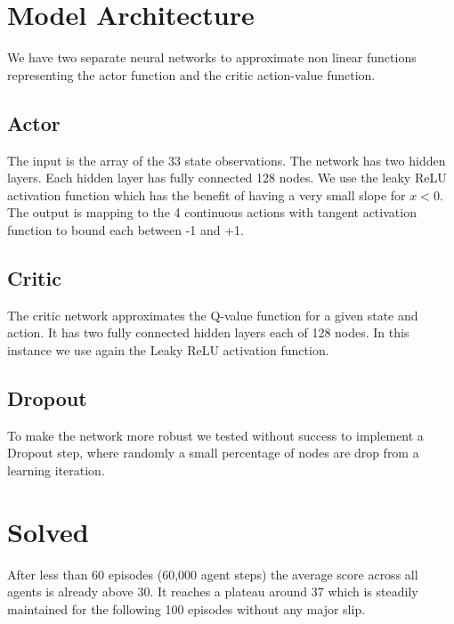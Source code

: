 \documentclass[pagenumber=off]{article}
\begin{document}
\section{Model Architecture}

We have two separate neural networks to approximate non linear functions representing the actor function and the critic action-value function. 

\subsection{Actor}
The input is the array of the 33 state observations.
The network has two hidden layers. Each hidden layer has fully connected 128 nodes.
We use the leaky ReLU activation function which has the benefit of having a very small slope for $x < 0$.
The output is mapping to the 4 continuous actions with tangent activation function to bound each between -1 and +1.

\subsection{Critic}
The critic network approximates the Q-value function for a given state and action.
It has two fully connected hidden layers each of 128 nodes.
In this instance we use again the Leaky ReLU activation function.

\subsection{Dropout}
To make the network more robust we tested without success to implement a Dropout step, where randomly a small percentage of nodes are drop from a learning iteration.


\newpage
\section{Solved}

After less than 60 episodes (60,000 agent steps) the average score across all agents is already above 30.
It reaches a plateau around 37 which is steadily maintained for the following 100 episodes without any major slip.
\end{document}
